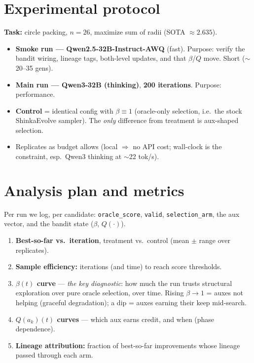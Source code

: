 \documentclass[11pt]{article}
\newcommand{\code}[1]{\texttt{\small #1}}
\begin{document}
\section{Experimental protocol}
\textbf{Task:} circle packing, $n=26$, maximize sum of radii (SOTA $\approx 2.635$).
\begin{itemize}[nosep]
  \item \textbf{Smoke run --- Qwen2.5-32B-Instruct-AWQ} (fast). Purpose: verify the bandit wiring,
        lineage tags, both-level updates, and that $\beta$/$Q$ move. Short ($\sim$20--35 gens).
  \item \textbf{Main run --- Qwen3-32B (thinking)}, \textbf{200 iterations}. Purpose: performance.
  \item \textbf{Control} = identical config with $\beta\equiv 1$ (oracle-only selection, i.e.\ the
        stock ShinkaEvolve sampler). The \emph{only} difference from treatment is aux-shaped selection.
  \item Replicates as budget allows (local $\Rightarrow$ no API cost; wall-clock is the constraint,
        esp.\ Qwen3 thinking at $\sim$22 tok/s).
\end{itemize}

\section{Analysis plan and metrics}
Per run we log, per candidate: \code{oracle\_score}, \code{valid}, \code{selection\_arm}, the aux
vector, and the bandit state ($\beta$, $Q(\cdot)$).
\begin{enumerate}[nosep,leftmargin=1.4em]
  \item \textbf{Best-so-far vs.\ iteration}, treatment vs.\ control (mean $\pm$ range over replicates).
  \item \textbf{Sample efficiency:} iterations (and time) to reach score thresholds.
  \item \textbf{$\beta(t)$ curve} --- \emph{the key diagnostic}: how much the run trusts structural
        exploration over pure oracle selection, over time. Rising $\beta\to1$ = auxes not helping
        (graceful degradation); a dip = auxes earning their keep mid-search.
  \item \textbf{$Q(a_k)(t)$ curves} --- which aux earns credit, and when (phase dependence).
  \item \textbf{Lineage attribution:} fraction of best-so-far improvements whose lineage passed
        through each arm.
\end{enumerate}
\end{document}
